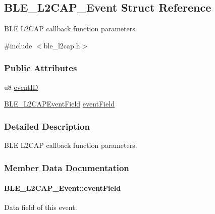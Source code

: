 \hypertarget{struct_b_l_e___l2_c_a_p___event}{}\subsection{B\+L\+E\+\_\+\+L2\+C\+A\+P\+\_\+\+Event Struct Reference}
\label{struct_b_l_e___l2_c_a_p___event}


B\+LE L2\+C\+AP callback function parameters.  




{\ttfamily \#include $<$ble\+\_\+l2cap.\+h$>$}

\subsubsection*{Public Attributes}
\begin{DoxyCompactItemize}
\item 
u8 \hyperlink{struct_b_l_e___l2_c_a_p___event_a6fa06e18d5adc7940a124cf09f865eda}{event\+ID}
\item 
\hyperlink{union_b_l_e___l2_c_a_p_event_field}{B\+L\+E\+\_\+\+L2\+C\+A\+P\+Event\+Field} \hyperlink{struct_b_l_e___l2_c_a_p___event_af983c2d2dceb9df8ced4520c02fb219c}{event\+Field}
\end{DoxyCompactItemize}


\subsubsection{Detailed Description}
B\+LE L2\+C\+AP callback function parameters. 

\subsubsection{Member Data Documentation}
\paragraph[{\texorpdfstring{event\+Field}{eventField}}]{ B\+L\+E\+\_\+\+L2\+C\+A\+P\+\_\+\+Event\+::event\+Field}\hypertarget{struct_b_l_e___l2_c_a_p___event_af983c2d2dceb9df8ced4520c02fb219c}{}\label{struct_b_l_e___l2_c_a_p___event_af983c2d2dceb9df8ced4520c02fb219c}
Data field of this event. 
